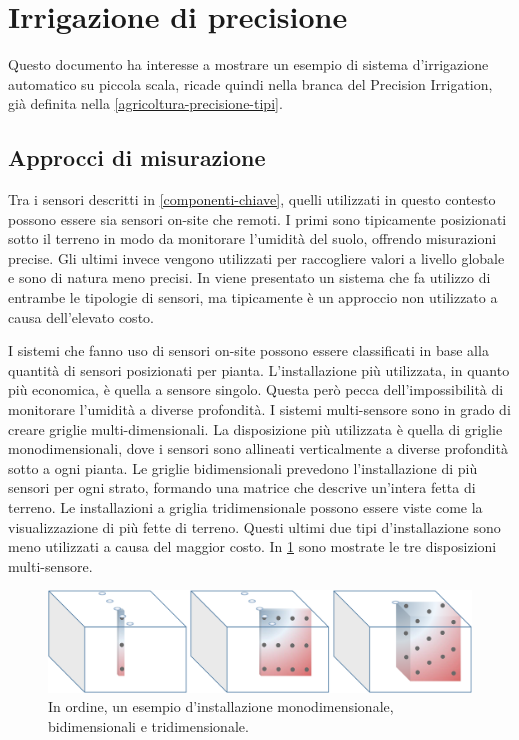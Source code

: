 \documentclass[12pt,a4paper,openright,twoside, openany]{book}
\begin{document}
\section{Irrigazione di precisione}
\label{irrigazione-di-precisione}

Questo documento ha interesse a mostrare un esempio di sistema d'irrigazione automatico su piccola scala, ricade quindi nella branca del Precision Irrigation, già definita nella \cref{agricoltura-precisione-tipi}.


\subsection{Approcci di misurazione}\label{approcci-misurazione}

Tra i sensori descritti in \cref{componenti-chiave}, quelli utilizzati in questo contesto possono essere sia sensori on-site che remoti.
I primi sono tipicamente posizionati sotto il terreno in modo da monitorare l'umidità del suolo, offrendo misurazioni precise.
Gli ultimi invece vengono utilizzati per raccogliere valori a livello globale e sono di natura meno precisi.
In \cite{Babaeian2021} viene presentato un sistema che fa utilizzo di entrambe le tipologie di sensori, ma tipicamente è un approccio non utilizzato a causa dell'elevato costo.

I sistemi che fanno uso di sensori on-site possono essere classificati in base alla quantità di sensori posizionati per pianta. L'installazione più utilizzata, in quanto più economica, è quella a sensore singolo. Questa però pecca dell'impossibilità di monitorare l'umidità a diverse profondità\cite{Arif2013}.
I sistemi multi-sensore sono in grado di creare griglie multi-dimensionali.
La disposizione più utilizzata è quella di griglie monodimensionali, dove i sensori sono allineati verticalmente a diverse profondità sotto a ogni pianta\cite{Karandish2016, Goldstein2017, Jimnez2020}.
Le griglie bidimensionali\cite{Egea2016, Cordeiro2016} prevedono l'installazione di più sensori per ogni strato, formando una matrice che descrive un'intera fetta di terreno.
Le installazioni a griglia tridimensionale\cite{ZapataSierra2021, Liang2021}  possono essere viste come la visualizzazione di più fette di terreno.
Questi ultimi due tipi d'installazione sono meno utilizzati a causa del maggior costo. In \cref{fig.griglie} sono mostrate le tre disposizioni multi-sensore.
\newpage
\begin{figure}[t]
    \centering\includegraphics[width=0.7\linewidth]{./figures/griglie.png}\caption{In ordine, un esempio d'installazione monodimensionale, bidimensionali e tridimensionale\cite{FRANCIA2022106924}.}\label{fig.griglie}
\end{figure}
\end{document}

